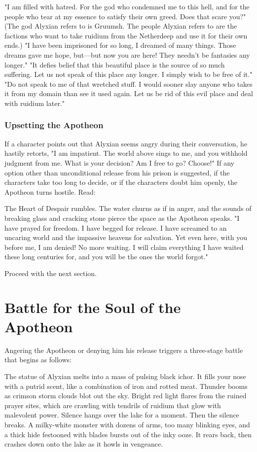 \documentclass[10pt,a4,twoside,twocolumn,openany,nodeprecatedcode]{dndbook}
\begin{document}
{{"I am filled with hatred. For the god who condemned me to this hell, and for the people who tear at my essence to satisfy their own greed. Does that scare you?" (The god Alyxian refers to is Gruumsh. The people Alyxian refers to are the factions who want to take ruidium from the Netherdeep and use it for their own ends.)}}
{{"I have been imprisoned for so long, I dreamed of many things. Those dreams gave me hope, but—but now you are here! They needn't be fantasies any longer."}}
{{"It defies belief that this beautiful place is the source of so much suffering. Let us not speak of this place any longer. I simply wish to be free of it."}}
{{"Do not speak to me of that wretched stuff. I would sooner slay anyone who takes it from my domain than see it used again. Let us be rid of this evil place and deal with ruidium later."}}
\subsubsection{Upsetting the Apotheon}
If a character points out that Alyxian seems angry during their conversation, he hastily retorts, "I am impatient. The world above sings to me, and you withhold judgment from me. What is your decision? Am I free to go? Choose!"
If any option other than unconditional release from his prison is suggested, if the characters take too long to decide, or if the characters doubt him openly, the Apotheon turns hostile. Read:
\begin{DndReadAloud}{}
The Heart of Despair rumbles. The water churns as if in anger, and the sounds of breaking glass and cracking stone pierce the space as the Apotheon speaks. "I have prayed for freedom. I have begged for release. I have screamed to an uncaring world and the impassive heavens for salvation. Yet even here, with you before me, I am denied! No more waiting. I will claim everything I have waited these long centuries for, and you will be the ones the world forgot."
\end{DndReadAloud}

Proceed with the next section.
\section{Battle for the Soul of the Apotheon}
Angering the Apotheon or denying him his release triggers a three-stage battle that begins as follows:
\begin{DndReadAloud}{}
The statue of Alyxian melts into a mass of pulsing black ichor. It fills your nose with a putrid scent, like a combination of iron and rotted meat. Thunder booms as crimson storm clouds blot out the sky. Bright red light flares from the ruined prayer sites, which are crawling with tendrils of ruidium that glow with malevolent power. Silence hangs over the lake for a moment.
Then the silence breaks. A milky-white monster with dozens of arms, too many blinking eyes, and a thick hide festooned with blades bursts out of the inky ooze. It rears back, then crashes down onto the lake as it howls in vengeance.
\end{DndReadAloud}
\end{document}

